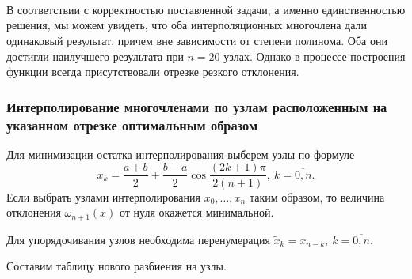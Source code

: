 \documentclass[11pt]{article}
\begin{document}
    \begin{center}
    \end{center}
    { \hspace*{\fill} \\}
    
    \begin{center}
    \end{center}
    { \hspace*{\fill} \\}
    
    \begin{center}
    \end{center}
    { \hspace*{\fill} \\}
    
    В соответствии с корректностью поставленной задачи, а именно
единственностью решения, мы можем увидеть, что оба интерполяционных
многочлена дали одинаковый результат, причем вне зависимости от степени
полинома. Оба они достигли наилучшего результата при \(n = 20\) узлах.
Однако в процессе построения функции всегда присутствовали отрезке
резкого отклонения.

    \subsubsection*{Интерполирование многочленами по узлам расположенным на указанном отрезке оптимальным образом}

Для минимизации остатка интерполирования выберем узлы по формуле
\[x_k = \dfrac{a+b}{2} + \dfrac{b-a}{2}\cos \dfrac{(2k+1)\pi}{2(n+1)},\ k=\overline{0,n}.\]
Если выбрать узлами интерполирования \(x_0,\ldots, x_n\) таким образом,
то величина отклонения \(\omega_{n+1}(x)\) от нуля окажется минимальной.

Для упорядочивания узлов необходима перенумерация
\(\widetilde{x}_k = x_{n-k},\ k=\overline{0,n}.\)

Составим таблицу нового разбиения на узлы.
\end{document}
